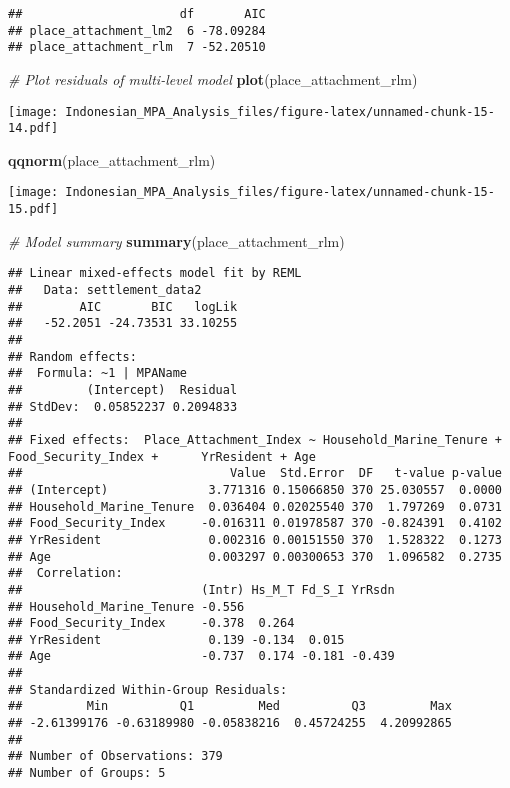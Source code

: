 \documentclass[
]{article}
\newenvironment{Shaded}{\begin{snugshade}}{\end{snugshade}}
\newcommand{\CommentTok}[1]{\textcolor[rgb]{0.56,0.35,0.01}{\textit{#1}}}
\newcommand{\FunctionTok}[1]{\textcolor[rgb]{0.13,0.29,0.53}{\textbf{#1}}}
\newcommand{\NormalTok}[1]{#1}
\begin{document}
\begin{verbatim}
##                      df       AIC
## place_attachment_lm2  6 -78.09284
## place_attachment_rlm  7 -52.20510
\end{verbatim}

\begin{Shaded}
\begin{Highlighting}[]
\CommentTok{\# Plot residuals of multi{-}level model}
\FunctionTok{plot}\NormalTok{(place\_attachment\_rlm)}
\end{Highlighting}
\end{Shaded}

\texttt{[image: Indonesian\_MPA\_Analysis\_files/figure-latex/unnamed-chunk-15-14.pdf]}

\begin{Shaded}
\begin{Highlighting}[]
\FunctionTok{qqnorm}\NormalTok{(place\_attachment\_rlm)}
\end{Highlighting}
\end{Shaded}

\texttt{[image: Indonesian\_MPA\_Analysis\_files/figure-latex/unnamed-chunk-15-15.pdf]}

\begin{Shaded}
\begin{Highlighting}[]
\CommentTok{\# Model summary}
\FunctionTok{summary}\NormalTok{(place\_attachment\_rlm)}
\end{Highlighting}
\end{Shaded}

\begin{verbatim}
## Linear mixed-effects model fit by REML
##   Data: settlement_data2 
##        AIC       BIC   logLik
##   -52.2051 -24.73531 33.10255
## 
## Random effects:
##  Formula: ~1 | MPAName
##         (Intercept)  Residual
## StdDev:  0.05852237 0.2094833
## 
## Fixed effects:  Place_Attachment_Index ~ Household_Marine_Tenure + Food_Security_Index +      YrResident + Age 
##                             Value  Std.Error  DF   t-value p-value
## (Intercept)              3.771316 0.15066850 370 25.030557  0.0000
## Household_Marine_Tenure  0.036404 0.02025540 370  1.797269  0.0731
## Food_Security_Index     -0.016311 0.01978587 370 -0.824391  0.4102
## YrResident               0.002316 0.00151550 370  1.528322  0.1273
## Age                      0.003297 0.00300653 370  1.096582  0.2735
##  Correlation: 
##                         (Intr) Hs_M_T Fd_S_I YrRsdn
## Household_Marine_Tenure -0.556                     
## Food_Security_Index     -0.378  0.264              
## YrResident               0.139 -0.134  0.015       
## Age                     -0.737  0.174 -0.181 -0.439
## 
## Standardized Within-Group Residuals:
##         Min          Q1         Med          Q3         Max 
## -2.61399176 -0.63189980 -0.05838216  0.45724255  4.20992865 
## 
## Number of Observations: 379
## Number of Groups: 5
\end{verbatim}
\end{document}
